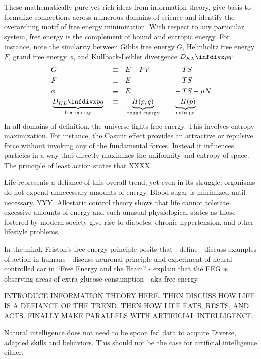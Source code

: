 \documentclass{article}
\begin{document}
These mathematically pure yet rich ideas from information theory, give basis to formalize connections across numerous domains of science and identify the overarching motif of free energy minimization. With respect to any particular system, free energy is the complement of bound and entropic energy. For instance, note the similarity between Gibbs free energy $G$, Helmholtz free energy $F$, grand free energy $\phi$, and Kullback-Leibler divergence $\kld{p}{q}$:
\begin{alignat*}{4}
& G    && \equiv && {} E + PV \quad && - TS \\
& F    && \equiv && {} E      \quad && - TS \\
& \phi && \equiv && {} E      \quad && - TS - \mu N \\
& \underbrace{\kld{p}{q}}_{\text{free energy}} && \equiv && {} \underbrace{H(p,q)}_{\text{bound energy}} \quad && \underbrace{- H(p)}_{\text{entropy}}
\end{alignat*}
In all domains of definition, the universe fights free energy. This involves entropy maximization. For instance, the Casmir effect provides an attractive or repulsive force without invoking any of the fundamental forces. Instead it influences particles in a way that directly maximizes the uniformity and entropy of space. The principle of least action states that XXXX.

Life represents a defiance of this overall trend, yet even in its struggle, organisms do not expend unnecessary amounts of energy. Blood sugar is minimized until necessary. YYY. Allostatic control theory shows that life cannot tolerate excessive amounts of energy and such unusual physiological states as those fostered by modern society give rise to diabetes, chronic hypertension, and other lifestyle problems.

In the mind, Friston’s free energy principle posits that 
- define
- discuss examples of action in humans
- discuss neuronal principle and experiment of neural controlled car in “Free Energy and the Brain”
- explain that the EEG is observing areas of extra glucose consumption - aka free energy



INTRODUCE INFORMATION THEORY HERE. THEN DISCUSS HOW LIFE IS A DEFIANCE OF THE TREND. THEN HOW LIFE EATS, RESTS, AND ACTS. FINALLY MAKE PARALLELS WITH ARTIFICIAL INTELLIGENCE. 

Natural intelligence does not need to be spoon fed data to acquire Diverse, adapted skills and behaviors. This should not be the case for artificial intelligence either. 
\end{document}
